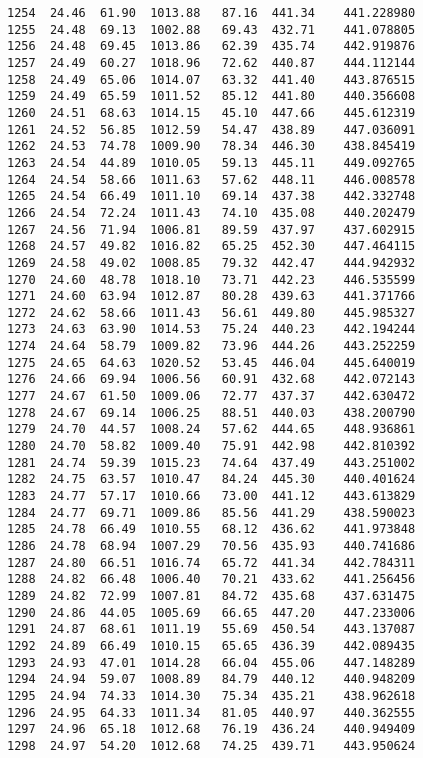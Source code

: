 \documentclass[11pt]{article}
\begin{document}
\begin{tcolorbox}[breakable, size=fbox, boxrule=.5pt, pad at break*=1mm, opacityfill=0]
\begin{Verbatim}[commandchars=\\\{\}]
1254  24.46  61.90  1013.88   87.16  441.34    441.228980
1255  24.48  69.13  1002.88   69.43  432.71    441.078805
1256  24.48  69.45  1013.86   62.39  435.74    442.919876
1257  24.49  60.27  1018.96   72.62  440.87    444.112144
1258  24.49  65.06  1014.07   63.32  441.40    443.876515
1259  24.49  65.59  1011.52   85.12  441.80    440.356608
1260  24.51  68.63  1014.15   45.10  447.66    445.612319
1261  24.52  56.85  1012.59   54.47  438.89    447.036091
1262  24.53  74.78  1009.90   78.34  446.30    438.845419
1263  24.54  44.89  1010.05   59.13  445.11    449.092765
1264  24.54  58.66  1011.63   57.62  448.11    446.008578
1265  24.54  66.49  1011.10   69.14  437.38    442.332748
1266  24.54  72.24  1011.43   74.10  435.08    440.202479
1267  24.56  71.94  1006.81   89.59  437.97    437.602915
1268  24.57  49.82  1016.82   65.25  452.30    447.464115
1269  24.58  49.02  1008.85   79.32  442.47    444.942932
1270  24.60  48.78  1018.10   73.71  442.23    446.535599
1271  24.60  63.94  1012.87   80.28  439.63    441.371766
1272  24.62  58.66  1011.43   56.61  449.80    445.985327
1273  24.63  63.90  1014.53   75.24  440.23    442.194244
1274  24.64  58.79  1009.82   73.96  444.26    443.252259
1275  24.65  64.63  1020.52   53.45  446.04    445.640019
1276  24.66  69.94  1006.56   60.91  432.68    442.072143
1277  24.67  61.50  1009.06   72.77  437.37    442.630472
1278  24.67  69.14  1006.25   88.51  440.03    438.200790
1279  24.70  44.57  1008.24   57.62  444.65    448.936861
1280  24.70  58.82  1009.40   75.91  442.98    442.810392
1281  24.74  59.39  1015.23   74.64  437.49    443.251002
1282  24.75  63.57  1010.47   84.24  445.30    440.401624
1283  24.77  57.17  1010.66   73.00  441.12    443.613829
1284  24.77  69.71  1009.86   85.56  441.29    438.590023
1285  24.78  66.49  1010.55   68.12  436.62    441.973848
1286  24.78  68.94  1007.29   70.56  435.93    440.741686
1287  24.80  66.51  1016.74   65.72  441.34    442.784311
1288  24.82  66.48  1006.40   70.21  433.62    441.256456
1289  24.82  72.99  1007.81   84.72  435.68    437.631475
1290  24.86  44.05  1005.69   66.65  447.20    447.233006
1291  24.87  68.61  1011.19   55.69  450.54    443.137087
1292  24.89  66.49  1010.15   65.65  436.39    442.089435
1293  24.93  47.01  1014.28   66.04  455.06    447.148289
1294  24.94  59.07  1008.89   84.79  440.12    440.948209
1295  24.94  74.33  1014.30   75.34  435.21    438.962618
1296  24.95  64.33  1011.34   81.05  440.97    440.362555
1297  24.96  65.18  1012.68   76.19  436.24    440.949409
1298  24.97  54.20  1012.68   74.25  439.71    443.950624

\end{Verbatim}
\end{tcolorbox}
\end{document}
